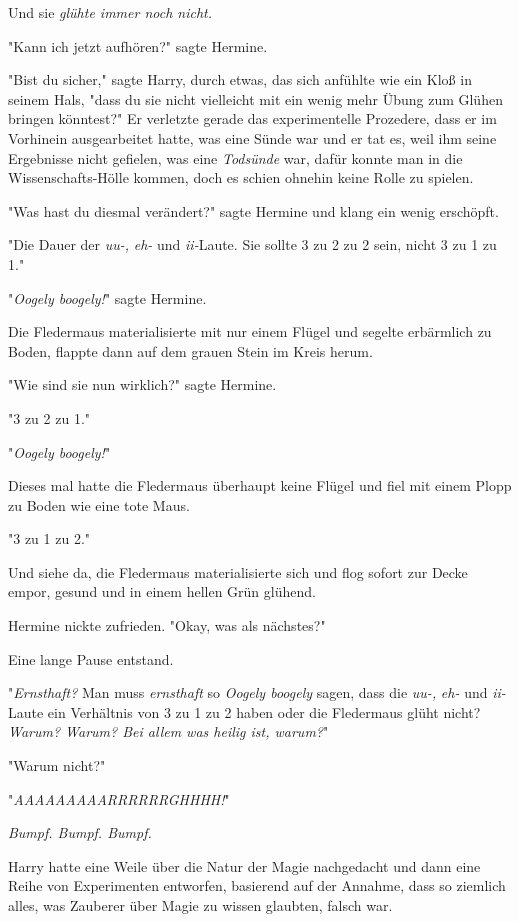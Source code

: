 {Und sie \emph{glühte immer noch nicht.}

"Kann ich jetzt aufhören?" sagte Hermine.

"Bist du sicher," sagte Harry, durch etwas, das sich anfühlte wie ein Kloß in seinem Hals, "dass du sie nicht vielleicht mit ein wenig mehr Übung zum Glühen bringen könntest?" Er verletzte gerade das experimentelle Prozedere, dass er im Vorhinein ausgearbeitet hatte, was eine Sünde war und er tat es, weil ihm seine Ergebnisse nicht gefielen, was eine \emph{Todsünde} war, dafür konnte man in die Wissenschafts-Hölle kommen, doch es schien ohnehin keine Rolle zu spielen.

"Was hast du diesmal verändert?" sagte Hermine und klang ein wenig erschöpft.

"Die Dauer der \emph{uu-,} \emph{eh-} und \emph{ii-}Laute. Sie sollte 3 zu 2 zu 2 sein, nicht 3 zu 1 zu 1."

"\emph{Oogely boogely!}" sagte Hermine.

Die Fledermaus materialisierte mit nur einem Flügel und segelte erbärmlich zu Boden, flappte dann auf dem grauen Stein im Kreis herum.

"Wie sind sie nun wirklich?" sagte Hermine.

"3 zu 2 zu 1."

"\emph{Oogely boogely!}"

Dieses mal hatte die Fledermaus überhaupt keine Flügel und fiel mit einem Plopp zu Boden wie eine tote Maus.

"3 zu 1 zu 2."

Und siehe da, die Fledermaus materialisierte sich und flog sofort zur Decke empor, gesund und in einem hellen Grün glühend.

Hermine nickte zufrieden. "Okay, was als nächstes?"

Eine lange Pause entstand.

"\emph{Ernsthaft?} Man muss \emph{ernsthaft} so \emph{Oogely boogely} sagen, dass die \emph{uu-,} \emph{eh-} und \emph{ii-}Laute ein Verhältnis von 3 zu 1 zu 2 haben oder die Fledermaus glüht nicht? \emph{Warum? Warum? Bei allem was heilig ist, warum?}"

"Warum nicht?"

"\emph{AAAAAAAAARRRRRRGHHHH!}"

\emph{Bumpf. Bumpf. Bumpf.}

Harry hatte eine Weile über die Natur der Magie nachgedacht und dann eine Reihe von Experimenten entworfen, basierend auf der Annahme, dass so ziemlich alles, was Zauberer über Magie zu wissen glaubten, falsch war.

}
